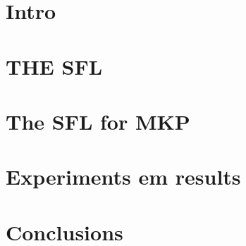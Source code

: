 \documentclass[10pt, conference, compsocconf]{IEEEtran}
\begin{document}
\section{Intro}
\section{THE SFL}
\section{The SFL for MKP}
\section{Experiments em results}
\section{Conclusions}

\printbibliography
\end{document}
